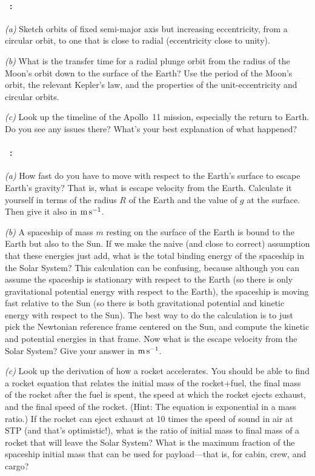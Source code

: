 \documentclass[12pt]{article}
\begin{document}
\paragraph{\problemname~\theproblem:}%
\textsl{(a)}
Sketch orbits of fixed semi-major axis but increasing
eccentricity, from a circular orbit, to one that is close to radial
(eccentricity close to unity).

\textsl{(b)}
What is the transfer time for a radial plunge orbit
from the radius of the Moon's orbit down to the surface of the Earth?
Use the period of the Moon's orbit, the relevant  Kepler's law, and
the properties of the unit-eccentricity and circular orbits.

\textsl{(c)}
Look up the timeline of the Apollo~11 mission, especially
the return to Earth.  Do you see any issues there? What's your best
explanation of what happened?

\paragraph{\problemname~\theproblem:}%
\textsl{(a)}
How fast do you have to move with respect to the Earth's surface to
escape Earth's gravity? That is, what is escape velocity from the Earth.
Calculate it yourself in terms of the radius $R$ of the Earth and the
value of $g$ at the surface. Then give it also in $\mathrm{m}\,\mathrm{s}^{-1}$.

\textsl{(b)} A spaceship of mass $m$ resting on the surface of the
Earth is bound to the Earth but also to the Sun. If we make
the naive (and close to correct) assumption that these energies just
add, what is the total binding energy of the spaceship in the Solar
System? This calculation can be confusing, because although you can assume
the spaceship is stationary with respect to the Earth (so there is
only gravitational potential energy with respect to the Earth), the
spaceship is moving fast relative to the Sun (so there is both
gravitational potential and kinetic energy with respect to the
Sun). The best way to do the calculation is to just pick the Newtonian reference
frame centered on the Sun, and compute the kinetic and potential
energies in that frame. Now what is the escape velocity from the Solar
System? Give your answer in $\mathrm{m}\,\mathrm{s}^{-1}$.

\textsl{(c)} Look up the derivation of how a rocket accelerates. You
should be able to find a rocket equation that relates the initial mass
of the rocket+fuel, the final mass of the rocket after the fuel is
spent, the speed at which the rocket ejects exhaust, and the final
speed of the rocket. (Hint: The equation is exponential in a mass
ratio.) If the rocket can eject exhaust at 10 times the speed of sound
in air at STP (and that's optimistic!), what is the ratio of initial
mass to final mass of a rocket that will leave the Solar System? What
is the maximum fraction of the spaceship initial mass that can be used
for payload---that is, for cabin, crew, and cargo?
\end{document}

